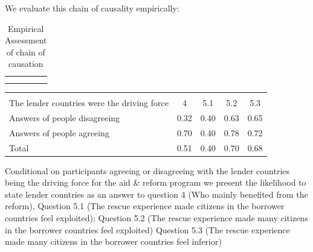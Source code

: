 We evaluate this chain of causality empirically: 
\begin{table}[h!]
    \centering
    \begin{tabular}{c|c}
         &  \\
         & 
    \end{tabular}
    \caption{Empirical Assessment of chain of causation }
    \label{tab:my_label}
\end{table}

\begin{table}[h!]
\begin{center}

\begin{tabular}{l*{1}{cccc}}
\hline\hline
                    &\multicolumn{4}{c}{}                               \\
 The lender countries were the driving force                   &   4 & 5.1 & 5.2 &  5.3 \\
\hline
Answers of people disagreeing                &        0.32&        0.40&        0.63&        0.65\\
Answers of people agreeing                &        0.70&        0.40&        0.78&        0.72\\
\hline
Total               &        0.51&        0.40&        0.70&        0.68\\
\hline\hline
\end{tabular}
\end{center}
\begin{tablenotes}
\item \tiny Conditional on participants agreeing or disagreeing with the lender countries being the driving force for the aid & reform program we present the likelihood to state lender countries as an answer to question 4 (Who mainly benefited from the reform), Question 5.1 (The rescue experience made citizens in the borrower countries feel exploited); Question 5.2 (The rescue experience made many citizens in the borrower countries feel exploited) Question 5.3 (The rescue experience made many citizens in the borrower countries feel inferior)
\end{tablenotes}
\end{table}

